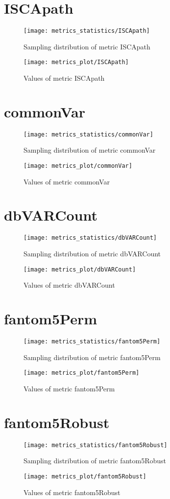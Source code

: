 \section{ISCApath}
\begin{figure}
  \texttt{[image: metrics\_statistics/ISCApath]}
  \caption{Sampling distribution of metric ISCApath}
\end{figure}
\begin{figure}
  \texttt{[image: metrics\_plot/ISCApath]}
  \caption{Values of metric ISCApath}
\end{figure}
\section{commonVar}
\begin{figure}
  \texttt{[image: metrics\_statistics/commonVar]}
  \caption{Sampling distribution of metric commonVar}
\end{figure}
\begin{figure}
  \texttt{[image: metrics\_plot/commonVar]}
  \caption{Values of metric commonVar}
\end{figure}
\section{dbVARCount}
\begin{figure}
  \texttt{[image: metrics\_statistics/dbVARCount]}
  \caption{Sampling distribution of metric dbVARCount}
\end{figure}
\begin{figure}
  \texttt{[image: metrics\_plot/dbVARCount]}
  \caption{Values of metric dbVARCount}
\end{figure}
\section{fantom5Perm}
\begin{figure}
  \texttt{[image: metrics\_statistics/fantom5Perm]}
  \caption{Sampling distribution of metric fantom5Perm}
\end{figure}
\begin{figure}
  \texttt{[image: metrics\_plot/fantom5Perm]}
  \caption{Values of metric fantom5Perm}
\end{figure}
\section{fantom5Robust}
\begin{figure}
  \texttt{[image: metrics\_statistics/fantom5Robust]}
  \caption{Sampling distribution of metric fantom5Robust}
\end{figure}
\begin{figure}
  \texttt{[image: metrics\_plot/fantom5Robust]}
  \caption{Values of metric fantom5Robust}
\end{figure}
